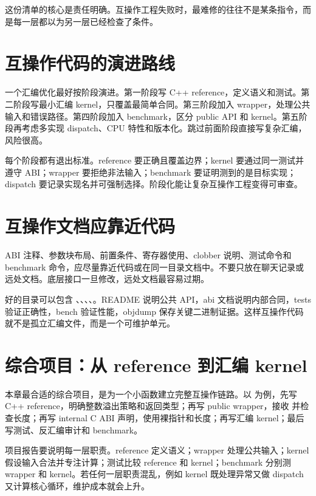这份清单的核心是责任明确。互操作工程失败时，最难修的往往不是某条指令，而是每一层都以为另一层已经检查了条件。

\section{互操作代码的演进路线}

一个汇编优化最好按阶段演进。第一阶段写 C++ reference，定义语义和测试。第二阶段写最小汇编 kernel，只覆盖最简单合同。第三阶段加入 wrapper，处理公共输入和错误路径。第四阶段加入 benchmark，区分 public API 和 kernel。第五阶段再考虑多实现 dispatch、CPU 特性和版本化。跳过前面阶段直接写复杂汇编，风险很高。

每个阶段都有退出标准。reference 要正确且覆盖边界；kernel 要通过同一测试并遵守 ABI；wrapper 要拒绝非法输入；benchmark 要证明测到的是目标实现；dispatch 要记录实现名并可强制选择。阶段化能让复杂互操作工程变得可审查。

\section{互操作文档应靠近代码}

ABI 注释、参数块布局、前置条件、寄存器使用、clobber 说明、测试命令和 benchmark 命令，应尽量靠近代码或在同一目录文档中。不要只放在聊天记录或远处文档。底层接口一旦修改，远处文档最容易过期。

好的目录可以包含 、、、、。README 说明公共 API，abi 文档说明内部合同，tests 验证正确性，bench 验证性能，objdump 保存关键二进制证据。这样互操作代码就不是孤立汇编文件，而是一个可维护单元。

\section{综合项目：从 reference 到汇编 kernel}

本章最合适的综合项目，是为一个小函数建立完整互操作链路。以  为例，先写 C++ reference，明确整数溢出策略和返回类型；再写 public wrapper，接收  并检查长度；再写 internal C ABI 声明，使用裸指针和长度；再写汇编 kernel；最后写测试、反汇编审计和 benchmark。

项目报告要说明每一层职责。reference 定义语义；wrapper 处理公共输入；kernel 假设输入合法并专注计算；测试比较 reference 和 kernel；benchmark 分别测 wrapper 和 kernel。若任何一层职责混乱，例如 kernel 既处理异常又做 dispatch 又计算核心循环，维护成本就会上升。

